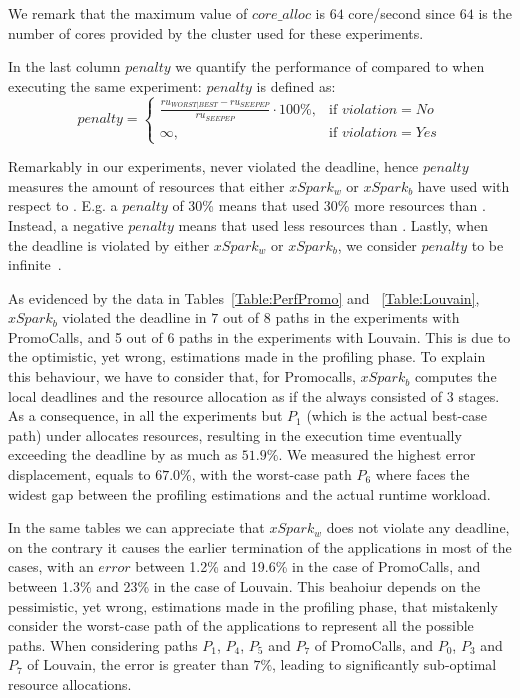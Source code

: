 We remark that the maximum value of $core\_alloc$ is $64$ core/second since $64$ is the number of cores provided by the cluster used for these experiments.

In the last column $penalty$ we quantify the performance of \tool compared to  \cSpark when executing the same experiment: $penalty$ is defined as:
\[
penalty = 
\begin{cases}
\frac{ru_{WORST|BEST}-ru_{SEEPEP}}{ru_{SEEPEP}}\cdot 100\%,& \text{if } violation = No \\
\infty,              & \text{if } violation = Yes
\end{cases}
\]

Remarkably in our experiments, \tool never violated the deadline, hence $penalty$ measures the amount of resources that either $xSpark_w$ or $xSpark_b$ have used with respect to \tool. E.g. a $penalty$ of 30\% means that \cSpark used 30\% more resources than \tool. Instead, a negative $penalty$ means that \cSpark used less  resources than \tool. Lastly, when the deadline is violated by either $xSpark_w$ or $xSpark_b$, we consider $penalty$ to be infinite~\cite{shin1994real}. 

As evidenced by the data in Tables~\ref{Table:PerfPromo} and ~\ref{Table:Louvain},  $xSpark_b$ violated the deadline in $7$ out of $8$ paths in the experiments with PromoCalls, and 5 out of 6 paths in the experiments with Louvain. This is due to the optimistic, yet wrong, estimations made in the profiling phase. To explain this behaviour, we have to consider that, for Promocalls, $xSpark_b$ computes the local deadlines and the resource allocation  as if the \plan always consisted of $3$ stages. As a consequence, in all the experiments but $P_1$ (which is the actual best-case path) \cSpark under allocates resources, resulting in the execution time eventually exceeding the deadline by as much as $51.9\%$. We measured the highest error displacement, equals to $67.0\%$, with the worst-case path $P_6$ where \cSpark faces the widest gap between the profiling estimations and the actual runtime workload. 

In the same tables we can appreciate that $xSpark_w$ does not violate any deadline, on the contrary it causes the earlier termination of the applications in most of the cases, with an $error$ between 1.2\% and 19.6\% in the case of PromoCalls, and between 1.3\% and 23\% in the case of Louvain. This beahoiur depends on the pessimistic, yet wrong, estimations made in the profiling phase,  that mistakenly consider the worst-case path of the applications to represent all the possible paths.
When considering paths $P_1$, $P_4$, $P_5$ and $P_7$ of PromoCalls,  and  $P_0$, $P_3$ and $P_7$ of Louvain, the error is greater than $7\%$, leading  to significantly sub-optimal resource allocations. 

